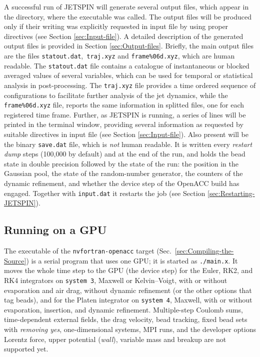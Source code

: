 A successful run of JETSPIN will generate several output files, which
appear in the directory, where the executable was called. The output
files will be produced only if their writing was explicitly requested
in input file by using proper directives (see Section \ref{sec:Input-file}).
A detailed description of the generated output files is provided in
Section \ref{sec:Output-files}. Briefly, the main output files are
the files \texttt{statout.dat},\texttt{ traj.xyz} and \texttt{frame\%06d.xyz},
which are human readable. The \texttt{statout.dat} file contains a catalogue of instantaneous
or blocked averaged values of several variables, which can be used
for temporal or statistical analysis in post-processing. The \texttt{traj.xyz}
file provides a time ordered sequence of configurations to facilitate
further analysis of the jet dynamics, while the \texttt{frame\%06d.xyz}
file, reports the same information in splitted files, one for each
registered time frame. Further, as JETSPIN is running, a series of
lines will be printed in the terminal window, providing several information
as requested by suitable directives in input file (see Section \ref{sec:Input-file}).
Also present will be the binary \texttt{save.dat} file, which is
\textit{not} human readable. It is written every \textit{restart dump}
steps (100,000 by default) and at the end of the run, and holds the bead
state in double precision followed by the state of the run: the position in
the Gaussian pool, the state of the random-number generator, the counters of
the dynamic refinement, and whether the device step of the OpenACC build has
engaged. Together with \texttt{input.dat} it restarts the job (see Section
\ref{sec:Restarting-JETSPIN}).

\subsection{Running on a GPU\label{sec:Running-GPU}}

The executable of the \texttt{nvfortran-openacc} target
(Sec.~\ref{sec:Compiling-the-Source}) is a serial program that uses one
GPU; it is started as \texttt{./main.x}. It moves the whole time step to
the GPU (the device step) for the Euler, RK2, and RK4 integrators on
\texttt{system 3}, Maxwell or Kelvin--Voigt, with or without evaporation and
air drag, without dynamic refinement (or the other options that tag beads),
and for the Platen integrator on \texttt{system 4}, Maxwell, with or
without evaporation, insertion, and dynamic refinement. Multiple-step
Coulomb sums, time-dependent external fields, the drag velocity, bead
tracking, fixed bead sets with \textit{removing yes}, one-dimensional
systems, MPI runs, and the developer options Lorentz force, upper potential
(\textit{wall}), variable mass and breakup are not supported yet.

